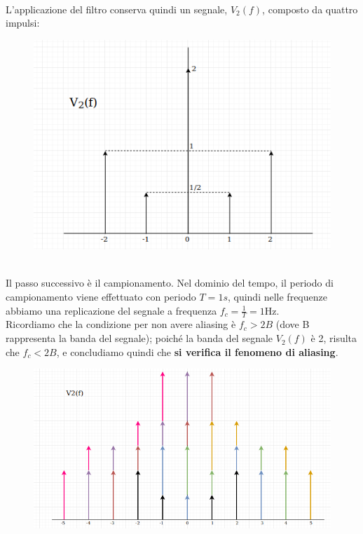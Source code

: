 \documentclass[12pt,a4paper]{article}
\begin{document}
	\\L'applicazione del filtro conserva quindi un segnale, $V_2(f)$, composto da quattro impulsi:
	\begin{figure}[h!]
		\centering
		\includegraphics[scale=0.4]{./images/fourier55_5.png}
	\end{figure}
	\\Il passo successivo è il campionamento. Nel dominio del tempo, il periodo di campionamento viene effettuato con periodo $T = 1s$, quindi nelle frequenze abbiamo una replicazione del segnale a frequenza $f_c = \frac{1}{T} = 1$Hz.\\Ricordiamo che la condizione per non avere aliasing è $f_c > 2B$ (dove B rappresenta la banda del segnale); poiché la banda del segnale $V_2(f)$ è 2, risulta che $f_c< 2B$, e concludiamo quindi che \textbf{si verifica il fenomeno di aliasing}.
	\begin{figure}[h!]
		\centering
		\includegraphics[scale=0.3]{./images/fourier55_6.png}
	\end{figure}
\end{document}
